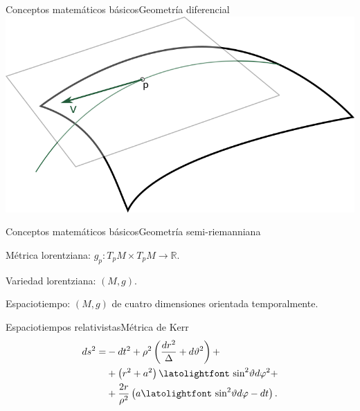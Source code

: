 \begin{frame}{Conceptos matemáticos básicos}{Geometría diferencial}
	\centering
	\includegraphics[height=0.4\paperwidth]{gfx/planotangente}
\end{frame}

\begin{frame}{Conceptos matemáticos básicos}{Geometría semi-riemanniana}
	\large
	\begin{fullpageitemize}
		\item Métrica lorentziana: $g_p \colon T_pM\times T_pM \to \mathbb{R}$.
		\pause
		\item Variedad lorentziana: $(M,g)$.
		\pause
		\item Espaciotiempo: $(M,g)$ de cuatro dimensiones orientada temporalmente.
	\end{fullpageitemize}
\end{frame}




\begin{frame}{Espaciotiempos relativistas}{Métrica de Kerr}
	{\Large
		\begin{align*}
		ds^2 = &-dt^2 + \rho^2\left(\frac{dr^2}{\Delta} + d\vartheta^2\right) + \\
		&+ \left(r^2 + a^2\right)\textrm{\latolightfont sin}^2\vartheta d\varphi^2 + \\
		\nonumber
		&+ \frac{2r}{\rho^2}\left(a\textrm{\latolightfont sin}^2\vartheta d\varphi - dt\right).
		\end{align*}
	}
\end{frame}


